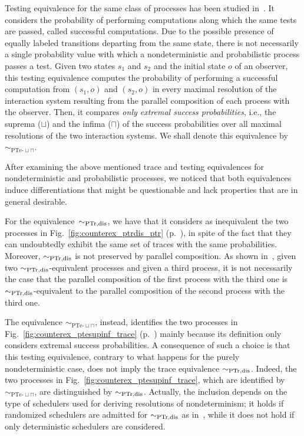 \documentclass{LMCS}
\newcommand{\sbis}[1]
	{\sim_{#1}}
\begin{document}
Testing equivalence for the same class of processes has been studied in~\cite{YL92,JY95,Seg96,DGHM08}. It
considers the probability of performing computations along which the same tests are passed, called
successful computations. Due to the possible presence of equally labeled transitions departing from the same
state, there is not necessarily a single probability value with which a nondeterministic and probabilistic
process passes a test. Given two states $s_{1}$ and $s_{2}$ and the initial state $o$ of an observer, this
testing equivalence computes the probability of performing a successful computation from $(s_{1}, o)$ and
$(s_{2}, o)$ in every maximal resolution of the interaction system resulting from the parallel composition
of each process with the observer. Then, it compares \emph{only extremal success probabilities}, i.e., the
suprema ($\sqcup$) and the infima ($\sqcap$) of the success probabilities over all maximal resolutions of
the two interaction systems. We shall denote this equivalence by $\sbis{\textrm{PTe-}\sqcup\sqcap}$.

After examining the above mentioned trace and testing equivalences for nondeterministic and probabilistic
processes, we noticed that both equivalences induce differentiations that might be questionable and lack
properties that are in general desirable.

For the equivalence~$\sbis{\rm PTr,dis}$, we have that it considers as inequivalent the two processes in
Fig.~\ref{fig:counterex_ptrdis_ptr} (p.~\pageref{fig:counterex_ptrdis_ptr}), in spite of the fact that they
can undoubtedly exhibit the same set of traces with the same probabilities. Moreover, $\sbis{\rm PTr,dis}$
is not preserved by parallel composition. As shown in~\cite{Seg95b}, given two $\sbis{\rm
PTr,dis}$-equivalent processes and given a third process, it is not necessarily the case that the parallel
composition of the first process with the third one is $\sbis{\rm PTr,dis}$-equivalent to the parallel
composition of the second process with the third one.

The equivalence $\sbis{\textrm{PTe-}\sqcup\sqcap}$, instead, identifies the two processes in
Fig.~\ref{fig:counterex_ptesupinf_trace} (p.~\pageref{fig:counterex_ptesupinf_trace}) mainly because its
definition only considers extremal success probabilities. A consequence of such a choice is that this
testing equivalence, contrary to what happens for the purely nondeterministic case, does not imply the trace
equivalence $\sbis{\rm PTr,dis}$. Indeed, the two processes in Fig.~\ref{fig:counterex_ptesupinf_trace},
which are identified by $\sbis{\textrm{PTe-}\sqcup\sqcap}$, are distinguished by $\sbis{\rm PTr,dis}$.
Actually, the inclusion depends on the type of schedulers used for deriving resolutions of nondeterminism;
it holds if randomized schedulers are admitted for $\sbis{\rm PTr,dis}$ as in~\cite{Seg95b}, while it does
not hold if only deterministic schedulers are considered.
\end{document}
